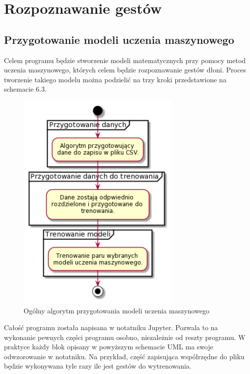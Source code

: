 
\section{Rozpoznawanie gestów}

\subsection{Przygotowanie modeli uczenia maszynowego}
\quad Celem programu będzie stworzenie modeli matematycznych przy pomocy metod uczenia maszynowego, których celem będzie rozpoznawanie gestów dłoni. Proces tworzenie takiego modelu można podzielić na trzy kroki przedstawione na schemacie 6.3. 

\begin{figure}[H]
    \begin{center}
        \includegraphics[width=8cm]{../images/full_algorithm.png}
        \caption{Ogólny algorytm przygotowania modeli uczenia maszynowego}
    \end{center}
\end{figure}

\quad Całość programu została napisana w notatniku Jupyter. Pozwala to na wykonanie pewnych części programu osobno, niezależnie od reszty programu. W praktyce każdy blok opisany w powyższym schemacie UML ma swoje odwzorowanie w notatniku. Na przykład, część zapisująca współrzędne do pliku będzie wykonywana tyle razy ile jest gestów do wytrenowania. 

